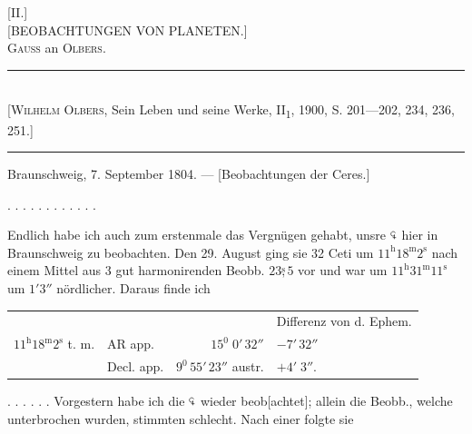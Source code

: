\clearpage\begingroup
\hypertarget{native-271-II}{}
\def\Bsec#1#2{#1\mathord{\overset{\mathrm{s}}{,}}#2}
\def\BCeres{\mathord{\tikz[baseline=-.2ex,x=1em,y=1em,line width=.045em]{
  \draw (.40,.47) .. controls (.30,.66) and (.02,.58) .. (.04,.36) .. controls (.06,.20) and (.25,.18) .. (.35,.29);
  \draw (.32,.34)--(.32,-.02);
  \draw (.19,.10)--(.46,.10);}}}
\def\BJuno{\mathord{\tikz[baseline=-.2ex,x=1em,y=1em,line width=.045em]{
  \draw (.23,.72)--(.23,-.04);
  \draw (.05,.63)--(.41,.39) (.05,.39)--(.41,.63);
  \draw (.06,.13)--(.40,.13);}}}
\begin{center}
[II.]\\[.6em]
[BEOBACHTUNGEN VON PLANETEN.]\\[.7em]
\textsc{Gauss} an \textsc{Olbers}.
\end{center}
\begin{center}\small
\rule{.94\linewidth}{.35pt}\\
{}[\textsc{Wilhelm Olbers}, Sein Leben und seine Werke, II\textsubscript{1}, 1900, S. 201—202, 234, 236, 251.]\\
\rule{.94\linewidth}{.35pt}
\end{center}
\begin{center}Braunschweig, 7. September 1804. — [Beobachtungen der Ceres.]\end{center}
\noindent . . . . . . . . . . . .\par
\noindent\hspace*{\parindent}Endlich habe ich auch zum erstenmale das Vergnügen gehabt, unsre $\BCeres$ hier in Braunschweig zu beobachten. Den 29. August ging sie 32 Ceti um $11^{\mathrm h}18^{\mathrm m}2^{\mathrm s}$ nach einem Mittel aus 3 gut harmonirenden Beobb. $\Bsec{23}5$ vor und war um $11^{\mathrm h}31^{\mathrm m}11^{\mathrm s}$ um $1'3''$ nördlicher. Daraus finde ich
\begin{center}\small\setlength{\tabcolsep}{6pt}
\begin{tabular}{rlrl}
&&&Differenz von d. Ephem.\\
$11^{\mathrm h}18^{\mathrm m}2^{\mathrm s}$ t. m.&AR app.&$15^0\;0'\,32''$&$-7'\,32''$\\
&Decl. app.&$9^0\,55'\,23''$ austr.&$+4'\;3''$.
\end{tabular}
\end{center}
\clearpage{}
\noindent\hspace*{\parindent}. . . . . . Vorgestern habe ich die $\BCeres$ wieder beob[achtet]; allein die Beobb., welche unterbrochen wurden, stimmten schlecht. Nach einer folgte sie
